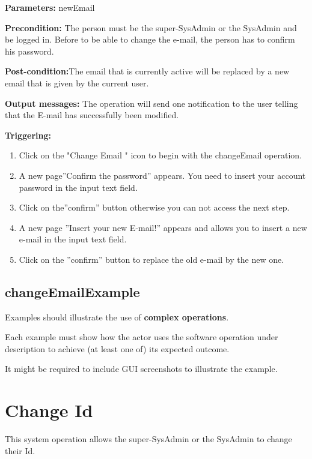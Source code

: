 \begin{description}

\item \textbf{Parameters:} newEmail
\item \textbf{Precondition:} The person must be the super-SysAdmin or the
SysAdmin and be logged in. Before to be able to change the e-mail, the person
has to confirm his password.
\item \textbf{Post-condition:}The email that is currently active will be
replaced by a new email that is given by the current user.
\item \textbf{Output messages:} The operation will send one notification to the
user telling that the E-mail has successfully been modified.


\item \textbf{Triggering:}
\begin{enumerate}
\item Click on the "Change Email " icon to begin with the changeEmail operation. 
\item A new page''Confirm the password'' appears. You need to insert your
account password in the input text field. 
\item Click on the''confirm'' button otherwise you can not access the next
step.
\item A new page ''Insert your new E-mail!'' appears and allows you to
insert a new e-mail in the input text field.
\item Click on the ''confirm'' button to replace the old e-mail by the new one.

\end{enumerate}

 
\end{description}

 
\subsection{changeEmailExample}
Examples should illustrate the use of \textbf{complex operations}.

Each example must show how the actor uses the software operation under
description to achieve (at least one of) its expected outcome.

It might be required to include GUI screenshots to illustrate the example.




\section{Change Id}
\label{operation:NewId}
This system operation allows the super-SysAdmin or the SysAdmin to change
their Id.

